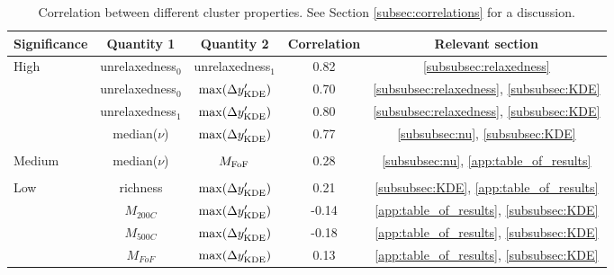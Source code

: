 \begin{table*}
	\centering
	\caption{Correlation between different cluster properties. See Section
		\ref{subsec:correlations} for a discussion.
	\label{tab:correlations}} 
\begin{tabular}{lcccc}
\hline 
Significance & Quantity 1 &  Quantity 2 &  Correlation & Relevant section\\
\hline
High & unrelaxedness$_0$ & unrelaxedness$_1$ & 0.82 & \ref{subsubsec:relaxedness}
\\
& unrelaxedness$_0$ & $\max(\Delta y_{\rm KDE}')$ &  0.70 &
\ref{subsubsec:relaxedness}, \ref{subsubsec:KDE}
\\ 
& unrelaxedness$_1$ & $\max(\Delta y_{\rm KDE}')$ &  0.80 & \ref{subsubsec:relaxedness}, \ref{subsubsec:KDE} \\ 
& median($\nu$) &  $\max(\Delta y_{\rm KDE}')$ & 0.77 & \ref{subsubsec:nu},
\ref{subsubsec:KDE}\\
\\ \hline
Medium & median($\nu$) & $M_{\rm FoF}$ & 0.28 & \ref{subsubsec:nu},
\ref{app:table_of_results}\\
\\ \hline
Low & richness & $\max(\Delta y_{\rm KDE}')$ & 0.21 & \ref{subsubsec:KDE}, \ref{app:table_of_results}\\  
& $M_{200C}$ &  $\max(\Delta y_{\rm KDE}')$ & -0.14 &
\ref{app:table_of_results}, \ref{subsubsec:KDE}\\ 
& $M_{500C}$ & $\max(\Delta y_{\rm KDE}')$ & -0.18 &
\ref{app:table_of_results}, \ref{subsubsec:KDE}\\
& $M_{FoF}$ & $\max(\Delta y_{\rm KDE}')$ & 0.13 & \ref{app:table_of_results}, \ref{subsubsec:KDE} \\
\hline
\end{tabular} 
\end{table*}

